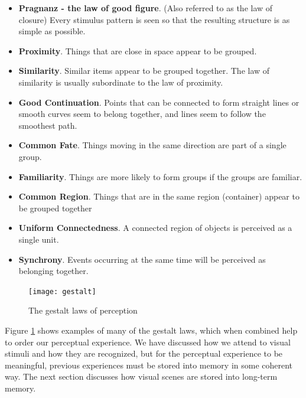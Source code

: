 \documentclass[11pt]{isuthesis}\usepackage[]{graphicx}\usepackage[]{color}
\begin{document}
\begin{itemize}
\item \textbf{Pragnanz - the law of good figure}. (Also referred to as the law of closure) Every stimulus pattern is seen so that the resulting structure is as simple as possible. 
\item \textbf{Proximity}. Things that are close in space appear to be grouped. 
\item \textbf{Similarity}. Similar items appear to be grouped together. The law of similarity is usually subordinate to the law of proximity. 
\item \textbf{Good Continuation}. Points that can be connected to form straight lines or smooth curves seem to belong together, and lines seem to follow the smoothest path. 
\item \textbf{Common Fate}. Things moving in the same direction are part of a single group.
\item \textbf{Familiarity}. Things are more likely to form groups if the groups are familiar. 
\item \textbf{Common Region}. Things that are in the same region (container) appear to be grouped together
\item \textbf{Uniform Connectedness}. A connected region of objects is perceived as a single unit.
\item \textbf{Synchrony}. Events occurring at the same time will be perceived as belonging together.
\end{itemize}

\begin{figure}[htbp]\centering
\texttt{[image: gestalt]}
\caption[The gestalt laws of perception]{The gestalt laws of perception \protect\footnotemark}\label{fig:gestaltlaws}
\end{figure}
\protect{}
Figure \ref{fig:gestaltlaws} shows examples of many of the gestalt laws, which when combined help to order our perceptual experience. We have discussed how we attend to visual stimuli and how they are recognized, but for the perceptual experience to be meaningful, previous experiences must be stored into memory in some coherent way. The next section discusses how visual scenes are stored into long-term memory. 
\end{document}
